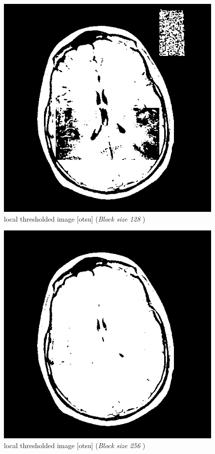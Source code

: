 \documentclass[letterpaper, 12 pt, conference ,onecolumn]{ieeeconf}  %
\begin{document}
\begin{figure}[h!]
\includegraphics[width=0.4\paperwidth]{otsu-thresholding/local/MRI-local-threshold-otsu128.jpg}
\centering
\caption{local thresholded image [otsu] (\textit{Block size 128 }) }
\label{fig:MRI-local-threshold-otsu128}
\end{figure}
 

\begin{figure}[h!]
\includegraphics[width=0.4\paperwidth]{otsu-thresholding/local/MRI-local-threshold-otsu256.jpg}
\centering
\caption{local thresholded image [otsu] (\textit{Block size 256 }) }
\label{fig:MRI-local-threshold-otsu256}
\end{figure} 
\end{document}
